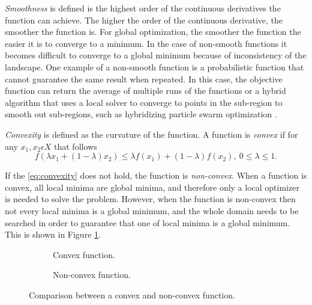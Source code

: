 \textit{Smoothness} is defined is the highest order of the continuous derivatives the function can achieve. The higher the order of the continuous derivative, the smoother the function is. For global optimization, the smoother the function the easier it is to converge to a minimum. In the case of non-smooth functions it becomes difficult to converge to a global minimum because of inconsistency of the landscape. One example of a non-smooth function is a probabilistic function that cannot guarantee the same result when repeated. In this case, the objective function can return the average of multiple runs of the functions or a hybrid algorithm that uses a local solver to converge to points in the sub-region to smooth out sub-regions, such as hybridizing particle swarm optimization \cite{Kaveh2014}.

\textit{Convexity} is defined as the curvature of the function. A function is \textit{convex} if for any $x_1,x_2 \epsilon X$ that follows
\begin{equation}
    \label{eq:convexity}
    f(\lambda x_1 + (1-\lambda)x_2) \leq \lambda f(x_1)+(1-\lambda)f(x_2),\ 0 \leq \lambda \leq 1.
\end{equation}

If the \eqref{eq:convexity} does not hold, the function is \textit{non-convex}. When a function is convex, all local minima are global minima, and therefore only a local optimizer is needed to solve the problem. However, when the function is non-convex then not every local minima is a global minimum, and the whole domain needs to be searched in order to guarantee that one of local minima is a global minimum. This is shown in Figure \ref{fig:convexity}.  

\begin{figure}[!h]
  
  \begin{subfigure}[t]{0.5\textwidth}
      \caption{Convex function.}
    \end{subfigure}
    \begin{subfigure}[t]{0.5\textwidth}
      \caption{Non-convex function.}
    \end{subfigure}
  \caption{Comparison between a convex and non-convex function.}
  \label{fig:convexity}
\end{figure}

